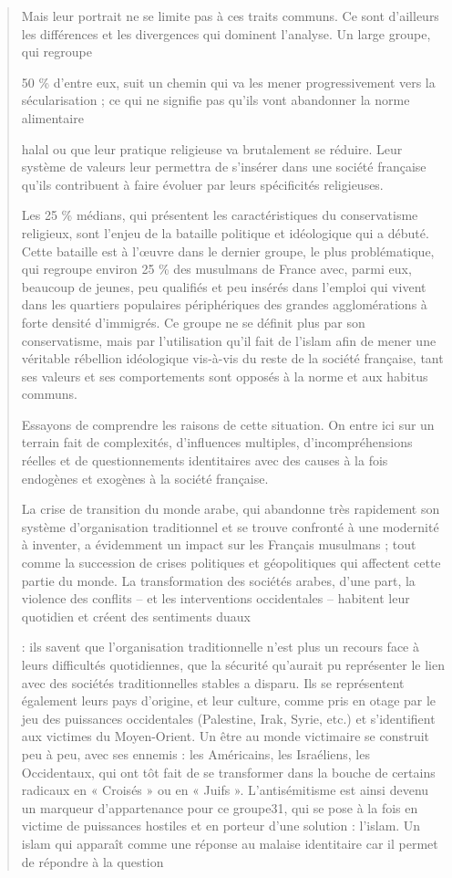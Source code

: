 \begin{quote}
Mais leur portrait ne se limite pas à ces traits communs. Ce sont
d'ailleurs les différences et les divergences qui dominent l'analyse. Un
large groupe, qui regroupe

50 \% d'entre eux, suit un chemin qui va les mener progressivement vers
la sécularisation ; ce qui ne signifie pas qu'ils vont abandonner la
norme alimentaire



halal ou que leur pratique religieuse va brutalement se réduire. Leur
système de valeurs leur permettra de s'insérer dans une société
française qu'ils contribuent à faire évoluer par leurs spécificités
religieuses.

Les 25 \% médians, qui présentent les caractéristiques du conservatisme
religieux, sont l'enjeu de la bataille politique et idéologique qui a
débuté. Cette bataille est à l'œuvre dans le dernier groupe, le plus
problématique, qui regroupe environ 25 \% des musulmans de France avec,
parmi eux, beaucoup de jeunes, peu qualifiés et peu insérés dans
l'emploi qui vivent dans les quartiers populaires périphériques des
grandes agglomérations à forte densité d'immigrés. Ce groupe ne se
définit plus par son conservatisme, mais par l'utilisation qu'il fait de
l'islam afin de mener une véritable rébellion idéologique vis-à-vis du
reste de la société française, tant ses valeurs et ses comportements
sont opposés à la norme et aux habitus communs.

Essayons de comprendre les raisons de cette situation. On entre ici sur
un terrain fait de complexités, d'influences multiples,
d'incompréhensions réelles et de questionnements identitaires avec des
causes à la fois endogènes et exogènes à la société française.

La crise de transition du monde arabe, qui abandonne très rapidement son
système d'organisation traditionnel et se trouve confronté à une
modernité à inventer, a évidemment un impact sur les Français musulmans
; tout comme la succession de crises politiques et géopolitiques qui
affectent cette partie du monde. La transformation des sociétés arabes,
d'une part, la violence des conflits -- et les interventions
occidentales -- habitent leur quotidien et créent des sentiments duaux

: ils savent que l'organisation traditionnelle n'est plus un recours
face à leurs difficultés quotidiennes, que la sécurité qu'aurait pu
représenter le lien avec des sociétés traditionnelles stables a disparu.
Ils se représentent également leurs pays d'origine, et leur culture,
comme pris en otage par le jeu des puissances occidentales (Palestine,
Irak, Syrie, etc.) et s'identifient aux victimes du Moyen-Orient. Un
être au monde victimaire se construit peu à peu, avec ses ennemis : les
Américains, les Israéliens, les Occidentaux, qui ont tôt fait de se
transformer dans la bouche de certains radicaux en « Croisés » ou en «
Juifs ». L'antisémitisme est ainsi devenu un marqueur d'appartenance
pour ce groupe31, qui se pose à la fois en victime de puissances
hostiles et en porteur d'une solution : l'islam. Un islam qui apparaît
comme une réponse au malaise identitaire car il permet de répondre à la
question


\end{quote}
